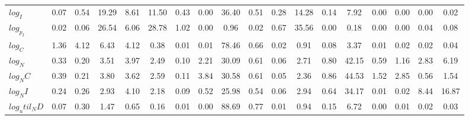 \begin{center}
\begin{longtable}{lccccccccccccccccc}
$log_I        $	 & 	            0.07	 & 	            0.54	 & 	           19.29	 & 	            8.61	 & 	           11.50	 & 	            0.43	 & 	            0.00	 & 	           36.40	 & 	            0.51	 & 	            0.28	 & 	           14.28	 & 	            0.14	 & 	            7.92	 & 	            0.00	 & 	            0.00	 & 	            0.00	 & 	            0.02 \\ 
$log_p_I      $	 & 	            0.02	 & 	            0.06	 & 	           26.54	 & 	            6.06	 & 	           28.78	 & 	            1.02	 & 	            0.00	 & 	            0.96	 & 	            0.02	 & 	            0.67	 & 	           35.56	 & 	            0.00	 & 	            0.18	 & 	            0.00	 & 	            0.00	 & 	            0.04	 & 	            0.08 \\ 
$log_C        $	 & 	            1.36	 & 	            4.12	 & 	            6.43	 & 	            4.12	 & 	            0.38	 & 	            0.01	 & 	            0.01	 & 	           78.46	 & 	            0.66	 & 	            0.02	 & 	            0.91	 & 	            0.08	 & 	            3.37	 & 	            0.01	 & 	            0.02	 & 	            0.02	 & 	            0.04 \\ 
$log_N        $	 & 	            0.33	 & 	            0.20	 & 	            3.51	 & 	            3.97	 & 	            2.49	 & 	            0.10	 & 	            2.21	 & 	           30.09	 & 	            0.61	 & 	            0.06	 & 	            2.71	 & 	            0.80	 & 	           42.15	 & 	            0.59	 & 	            1.16	 & 	            2.83	 & 	            6.19 \\ 
$log_NC       $	 & 	            0.39	 & 	            0.21	 & 	            3.80	 & 	            3.62	 & 	            2.59	 & 	            0.11	 & 	            3.84	 & 	           30.58	 & 	            0.61	 & 	            0.05	 & 	            2.36	 & 	            0.86	 & 	           44.53	 & 	            1.52	 & 	            2.85	 & 	            0.56	 & 	            1.54 \\ 
$log_NI       $	 & 	            0.24	 & 	            0.26	 & 	            2.93	 & 	            4.10	 & 	            2.18	 & 	            0.09	 & 	            0.52	 & 	           25.98	 & 	            0.54	 & 	            0.06	 & 	            2.94	 & 	            0.64	 & 	           34.17	 & 	            0.01	 & 	            0.02	 & 	            8.44	 & 	           16.87 \\ 
$log_util_ND  $	 & 	            0.07	 & 	            0.30	 & 	            1.47	 & 	            0.65	 & 	            0.16	 & 	            0.01	 & 	            0.00	 & 	           88.69	 & 	            0.77	 & 	            0.01	 & 	            0.94	 & 	            0.15	 & 	            6.72	 & 	            0.00	 & 	            0.01	 & 	            0.02	 & 	            0.03 \\ 

\end{longtable}
\end{center}
